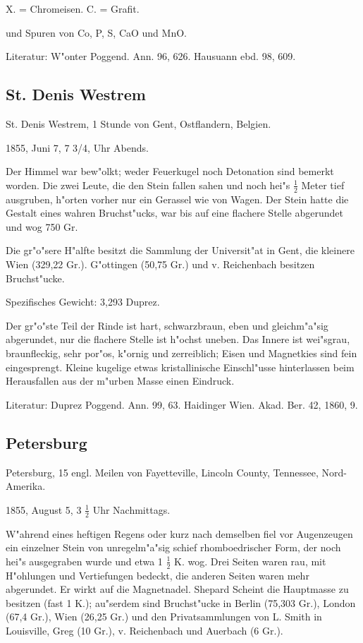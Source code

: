 \documentclass[a4paper, 11pt, oneside]{article}
\begin{document}
X. = Chromeisen. C. = Grafit.

und Spuren von Co, P, S, CaO und MnO.

Literatur: W"onter Poggend. Ann. 96, 626. Hausuann ebd. 98, 609.

\subsection{St. Denis Westrem}

St. Denis Westrem, 1 Stunde von Gent, Ostflandern, Belgien.

1855, Juni 7, 7 3/4, Uhr Abends.

Der Himmel war bew"olkt; weder Feuerkugel noch Detonation sind bemerkt worden. Die zwei Leute, die den Stein fallen sahen und noch hei"s $\frac{1}{2}$ Meter tief ausgruben, h"orten vorher nur ein Gerassel wie von Wagen. Der Stein hatte die Gestalt eines wahren Bruchst"ucks, war bis auf eine flachere Stelle abgerundet und wog 750 Gr.

Die gr"o"sere H"alfte besitzt die Sammlung der Universit"at in Gent, die kleinere Wien (329,22 Gr.). G"ottingen (50,75 Gr.) und v. Reichenbach besitzen Bruchst"ucke.

Spezifisches Gewicht: 3,293 Duprez.

Der gr"o"ste Teil der Rinde ist hart, schwarzbraun, eben und gleichm"a"sig abgerundet, nur die flachere Stelle ist h"ochst uneben. Das Innere ist wei"sgrau, braunfleckig, sehr por"os, k"ornig und zerreiblich; Eisen und Magnetkies sind fein eingesprengt. Kleine kugelige etwas kristallinische Einschl"usse hinterlassen beim Herausfallen aus der m"urben Masse einen Eindruck.

Literatur: Duprez Poggend. Ann. 99, 63. Haidinger Wien. Akad. Ber. 42, 1860, 9.

\subsection{Petersburg}

Petersburg, 15 engl. Meilen von Fayetteville, Lincoln County, Tennessee, Nord-Amerika.

1855, August 5, 3 $\frac{1}{2}$ Uhr Nachmittags.

W"ahrend eines heftigen Regens oder kurz nach demselben fiel vor Augenzeugen ein einzelner Stein von unregelm"a"sig schief rhomboedrischer Form, der noch hei"s ausgegraben wurde und etwa 1 $\frac{1}{2}$ K. wog. Drei Seiten waren rau, mit H"ohlungen und Vertiefungen bedeckt, die anderen Seiten waren mehr abgerundet. Er wirkt auf die Magnetnadel. Shepard Scheint die Hauptmasse zu besitzen (fast 1 K.); au"serdem sind Bruchst"ucke in Berlin (75,303 Gr.), London (67,4 Gr.), Wien (26,25 Gr.) und den Privatsammlungen von L. Smith in Louisville, Greg (10 Gr.), v. Reichenbach und Auerbach (6 Gr.).
\end{document}
